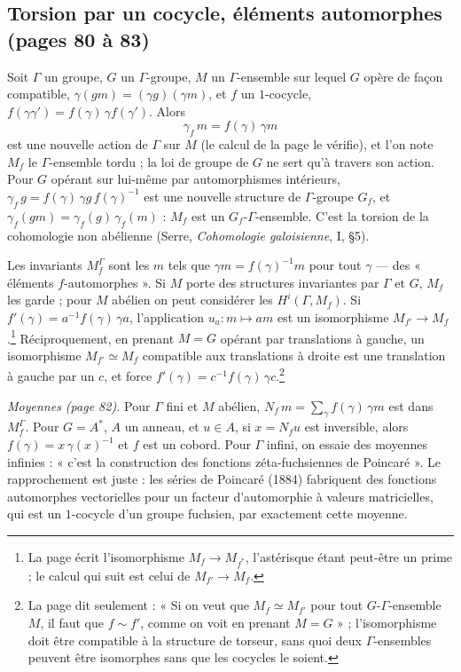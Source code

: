 \documentclass[11pt,a4paper]{article}
\begin{document}
\subsection*{Torsion par un cocycle, éléments automorphes (pages 80 à 83)}

Soit $\Gamma$ un groupe, $G$ un $\Gamma$-groupe, $M$ un $\Gamma$-ensemble sur
lequel $G$ opère de façon compatible, $\gamma(gm) = (\gamma g)(\gamma m)$, et $f$
un $1$-cocycle, $f(\gamma\gamma') = f(\gamma)\,\gamma f(\gamma')$. Alors
\[
\gamma_f\,m = f(\gamma)\,\gamma m
\]
est une nouvelle action de $\Gamma$ sur $M$ (le calcul de la page le
vérifie), et l'on note $M_f$ le $\Gamma$-ensemble tordu ; la loi de groupe de
$G$ ne sert qu'à travers son action. Pour $G$ opérant sur lui-même par
automorphismes intérieurs, $\gamma_f\,g = f(\gamma)\,\gamma g\,f(\gamma)^{-1}$ est
une nouvelle structure de $\Gamma$-groupe $G_f$, et $\gamma_f(gm) =
\gamma_f(g)\,\gamma_f(m)$ : $M_f$ est un $G_f$-$\Gamma$-ensemble. C'est la
torsion de la cohomologie non abélienne (Serre, \emph{Cohomologie galoisienne},
I, §5).

Les invariants $M_f^{\Gamma}$ sont les $m$ tels que $\gamma m = f(\gamma)^{-1}m$
pour tout $\gamma$ — des « éléments $f$-automorphes ». Si $M$ porte des
structures invariantes par $\Gamma$ et $G$, $M_f$ les garde ; pour $M$
abélien on peut considérer les $H^{i}(\Gamma, M_f)$. Si $f'(\gamma) =
a^{-1}f(\gamma)\,\gamma a$, l'application $u_a : m \mapsto am$ est un
isomorphisme $M_{f'} \to M_f$.\footnote{La page écrit l'isomorphisme $M_f \to
M_{f^{*}}$, l'astérisque étant peut-être un prime ; le calcul qui suit est
celui de $M_{f'} \to M_f$.} Réciproquement, en prenant $M = G$ opérant par
translations à gauche, un isomorphisme $M_{f'} \simeq M_f$ compatible aux
translations à droite est une translation à gauche par un $c$, et force
$f'(\gamma) = c^{-1}f(\gamma)\,\gamma c$.\footnote{La page dit seulement : « Si
on veut que $M_f \simeq M_{f'}$ pour tout $G$-$\Gamma$-ensemble $M$, il faut que
$f \sim f'$, comme on voit en prenant $M = G$ » ; l'isomorphisme doit être
compatible à la structure de torseur, sans quoi deux $\Gamma$-ensembles peuvent
être isomorphes sans que les cocycles le soient.}

\emph{Moyennes (page 82).} Pour $\Gamma$ fini et $M$ abélien, $N_f\,m =
\sum_{\gamma} f(\gamma)\,\gamma m$ est dans $M_f^{\Gamma}$. Pour $G = A^{*}$,
$A$ un anneau, et $u \in A$, si $x = N_f u$ est inversible, alors $f(\gamma) =
x\,\gamma(x)^{-1}$ et $f$ est un cobord. Pour $\Gamma$ infini, on essaie des
moyennes infinies : « c'est la construction des fonctions zéta-fuchsiennes de
Poincaré ». Le rapprochement est juste : les séries de Poincaré (1884)
fabriquent des fonctions automorphes vectorielles pour un facteur
d'automorphie à valeurs matricielles, qui est un $1$-cocycle d'un groupe
fuchsien, par exactement cette moyenne.
\end{document}

